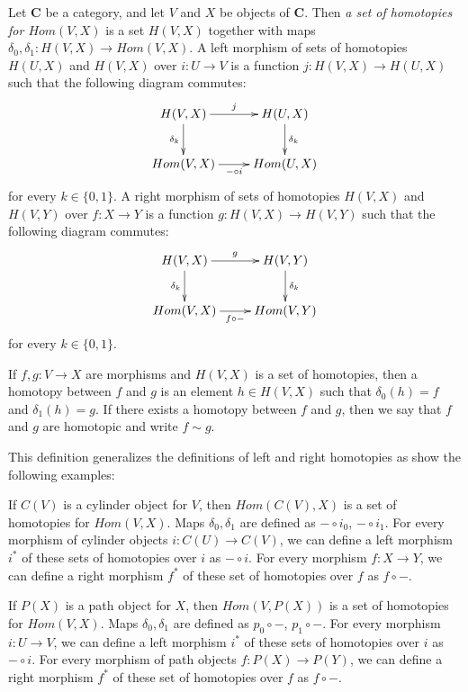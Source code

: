\documentclass{amsart}
\theoremstyle{definition}
\newcommand{\cat}[1]{\mathbf{#1}}
\newcommand{\C}{\cat{C}}
\newcommand{\cyli}{i}
\begin{document}
Let $\C$ be a category, and let $V$ and $X$ be objects of $\C$.
Then \emph{a set of homotopies for $Hom(V,X)$} is a set $H(V,X)$ together with maps $\delta_0,\delta_1 : H(V,X) \to Hom(V,X)$.
A left morphism of sets of homotopies $H(U,X)$ and $H(V,X)$ over $i : U \to V$ is a function $j : H(V,X) \to H(U,X)$ such that the following diagram commutes:
\[ \xymatrix{ H(V,X) \ar[r]^j \ar[d]_{\delta_k} & H(U,X) \ar[d]^{\delta_k} \\
              Hom(V,X) \ar[r]_{- \circ i} & Hom(U,X)
            } \]
for every $k \in \{ 0, 1 \}$.
A right morphism of sets of homotopies $H(V,X)$ and $H(V,Y)$ over $f : X \to Y$ is a function $g : H(V,X) \to H(V,Y)$ such that the following diagram commutes:
\[ \xymatrix{ H(V,X) \ar[r]^g \ar[d]_{\delta_k} & H(V,Y) \ar[d]^{\delta_k} \\
              Hom(V,X) \ar[r]_{f \circ -} & Hom(V,Y)
            } \]
for every $k \in \{ 0, 1 \}$.

If $f,g : V \to X$ are morphisms and $H(V,X)$ is a set of homotopies,
then a homotopy between $f$ and $g$ is an element $h \in H(V,X)$ such that $\delta_0(h) = f$ and $\delta_1(h) = g$.
If there exists a homotopy between $f$ and $g$, then we say that $f$ and $g$ are homotopic and write $f \sim g$.

This definition generalizes the definitions of left and right homotopies as show the following examples:

\begin{example}
If $C(V)$ is a cylinder object for $V$, then $Hom(C(V),X)$ is a set of homotopies for $Hom(V,X)$.
Maps $\delta_0,\delta_1$ are defined as $- \circ \cyli_0$, $- \circ \cyli_1$.
For every morphism of cylinder objects $i : C(U) \to C(V)$, we can define a left morphism $i^*$ of these sets of homotopies over $i$ as $- \circ i$.
For every morphism $f : X \to Y$, we can define a right morphism $f^*$ of these set of homotopies over $f$ as $f \circ -$.
\end{example}

\begin{example}
If $P(X)$ is a path object for $X$, then $Hom(V,P(X))$ is a set of homotopies for $Hom(V,X)$.
Maps $\delta_0,\delta_1$ are defined as $p_0 \circ -$, $p_1 \circ -$.
For every morphism $i : U \to V$, we can define a left morphism $i^*$ of these sets of homotopies over $i$ as $- \circ i$.
For every morphism of path objects $f : P(X) \to P(Y)$, we can define a right morphism $f^*$ of these set of homotopies over $f$ as $f \circ -$.
\end{example}
\end{document}
